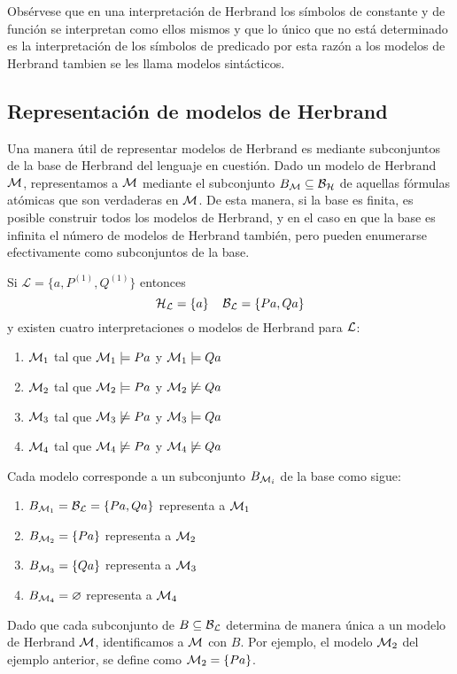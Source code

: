 \documentclass[11pt,letterpaper]{article}
\begin{document}
Obs\'ervese que en una interpretaci\'on de Herbrand los s\'imbolos de constante 
y de funci\'on se interpretan como ellos mismos y que lo \'unico que no est\'a
determinado es la interpretaci\'on de los s\'imbolos de predicado por esta
raz\'on a los modelos de Herbrand tambien se les llama modelos sint\'acticos.


\subsection{Representaci\'on de modelos de Herbrand}

Una manera \'util de representar modelos de Herbrand es mediante subconjuntos de
la base de Herbrand del lenguaje en cuesti\'on. Dado un modelo de Herbrand 
$\mathcal{M}$, representamos a $\mathcal{M}$ mediante el subconjunto $B_{\mathcal{M}}\subseteq\mathcal{B}_{\mathcal{H}}$ de aquellas 
f\'ormulas at\'omicas que son verdaderas en $\mathcal{M}$. De esta manera, si la base es 
finita, es posible construir todos los modelos de Herbrand, y en el caso en que 
la base es infinita el n\'umero de modelos de Herbrand tambi\'en, pero pueden 
enumerarse efectivamente como subconjuntos de la base.

\beje
Si $\mathcal{L}=\{a, P^{(1)},Q^{(1)}\}$ entonces 
\[
\mathcal{H}_{\mathcal{L}}=\{a\}\;\;\;\;\mathcal{B}_{\mathcal{L}}=\{Pa,Qa\}
\]
y existen cuatro interpretaciones o modelos de Herbrand para $\mathcal{L}$:
\begin{enumerate}
\item $\mathcal{M}_1$ tal que $\mathcal{M}_1\models Pa$ y $\mathcal{M}_1\models Qa$
\item $\mathcal{M}_2$ tal que $\mathcal{M}_2\models Pa$ y $\mathcal{M}_2\not\models Qa$
\item $\mathcal{M}_3$ tal que $\mathcal{M}_3\not\models Pa$ y $\mathcal{M}_3\models Qa$
\item $\mathcal{M}_4$ tal que $\mathcal{M}_4\not\models Pa$ y $\mathcal{M}_4\not\models Qa$
\end{enumerate}
Cada modelo corresponde a un subconjunto $B_{\mathcal{M}_i}$ de la base como sigue:
\begin{enumerate}
\item $B_{\mathcal{M}_1}=\mathcal{B}_{\mathcal{L}}=\{Pa,Qa\}$ representa a $\mathcal{M}_1$
\item $B_{\mathcal{M}_2}=\{Pa\}$ representa a $\mathcal{M}_2$
\item $B_{\mathcal{M}_3}=\{Qa\}$ representa a $\mathcal{M}_3$
\item $B_{\mathcal{M}_4}=\varnothing$ representa a $\mathcal{M}_4$

\end{enumerate}
\eeje

Dado que cada subconjunto de $B\subseteq \mathcal{B}_{\mathcal{L}}$ determina de manera \'unica a un 
modelo de Herbrand $\mathcal{M}$,  identificamos a $\mathcal{M}$ con $B$. Por ejemplo, el modelo 
$\mathcal{M}_2$ del ejemplo anterior, se define como $\mathcal{M}_2=\{Pa\}$.
\end{document}
